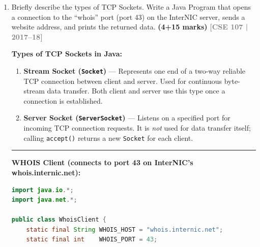 \documentclass[12pt,a3paper]{article}
\newcommand{\yr}[1]{\hfill\textcolor{gray}{\small\textbf{[#1]}}}
\newcommand{\mk}[1]{\textcolor{orange!70!black}{\small\textbf{(#1 marks)}}}
\begin{document}
\begin{enumerate}
\begin{tcolorbox}
\begin{lstlisting}[language=Java]
// Usage
ObjectOutputStream oos = new ObjectOutputStream(
    socket.getOutputStream());
oos.writeObject(new Point(3, 4));   // OK

// Wrong: no Serializable -> throws NotSerializableException
class BadPoint { int x, y; }
oos.writeObject(new BadPoint());    // runtime exception!
\end{lstlisting}

\end{tcolorbox}

\item Briefly describe the types of TCP Sockets. Write a Java Program that opens a connection to the ``whois'' port (port 43) on the InterNIC server, sends a website address, and prints the returned data. \mk{4+15}
\yr{CSE 107 | 2017--18}

\begin{tcolorbox}[enhanced,breakable,ansbox,
  colback=cB!4,colframe=cB,boxrule=0.8pt,arc=5pt,
  title={\textbf{Answer — TCP Socket Types and WHOIS
  Client}},
  fonttitle=\bfseries\color{white},colbacktitle=cB]

\textbf{Types of TCP Sockets in Java:}

\begin{enumerate}[label=\textbf{\arabic*.}, itemsep=3pt]
  \item \textbf{Stream Socket (\texttt{Socket})} ---
  Represents one end of a two-way reliable TCP
  connection between client and server. Used for
  continuous byte-stream data transfer.
  Both client and server use this type once a
  connection is established.

  \item \textbf{Server Socket (\texttt{ServerSocket})}
  --- Listens on a specified port for incoming TCP
  connection requests. It is \emph{not} used for
  data transfer itself; calling \texttt{accept()}
  returns a new \texttt{Socket} for each client.
\end{enumerate}

\medskip
\textcolor{cC}{\rule{\textwidth}{0.4pt}}
\medskip

\textbf{WHOIS Client (connects to port 43 on
InterNIC's whois.internic.net):}

\begin{lstlisting}[language=Java]
import java.io.*;
import java.net.*;

public class WhoisClient {
    static final String WHOIS_HOST = "whois.internic.net";
    static final int    WHOIS_PORT = 43;


\end{lstlisting}
\end{tcolorbox}
\end{enumerate}
\end{document}
